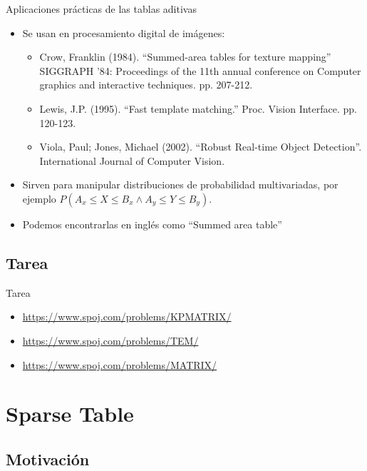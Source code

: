 \documentclass{beamer}
\begin{document}
\begin{frame}{Aplicaciones prácticas de las tablas aditivas}
  \begin{itemize}
     \item Se usan en procesamiento digital de imágenes:
        \begin{itemize}
            \footnotesize
            \item Crow, Franklin (1984). ``Summed-area tables for texture mapping'' SIGGRAPH '84: Proceedings of the 11th annual conference on Computer graphics and interactive techniques. pp. 207-212.
            \item Lewis, J.P. (1995). ``Fast template matching.'' Proc. Vision Interface. pp. 120-123.
            \item Viola, Paul; Jones, Michael (2002). ``Robust Real-time Object Detection''. International Journal of Computer Vision.
        \end{itemize}
     \item Sirven para manipular distribuciones de probabilidad multivariadas, por ejemplo $P(A_x \leq X \leq B_x \land A_y \leq Y \leq B_y)$.
     \item Podemos encontrarlas en inglés como ``Summed area table''
  \end{itemize}
\end{frame}

\subsection{Tarea}
\begin{frame}{Tarea}
  \begin{itemize}
     \item \url{https://www.spoj.com/problems/KPMATRIX/}
     \item \url{https://www.spoj.com/problems/TEM/}
     \item \url{https://www.spoj.com/problems/MATRIX/}
  \end{itemize}
\end{frame}

\section{Sparse Table}

\subsection{Motivación}
\end{document}

